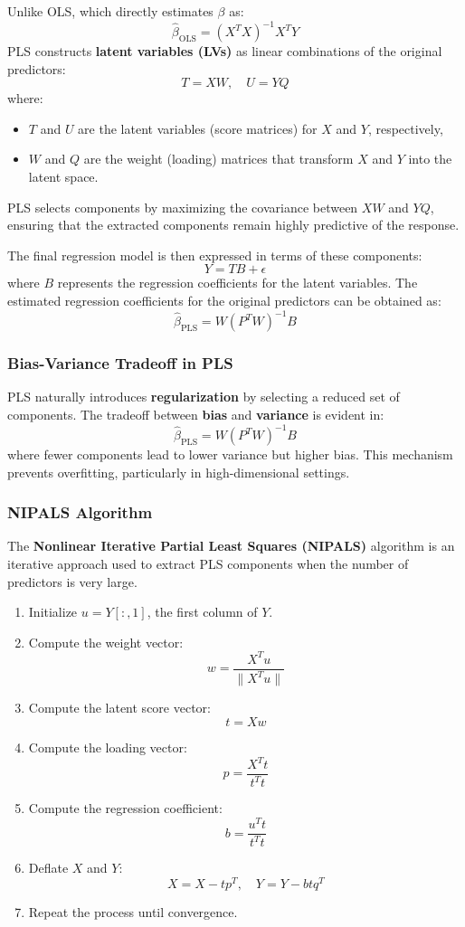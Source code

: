 \documentclass[11pt,twoside,a4paper]{article}
\begin{document}
Unlike OLS, which directly estimates \( \beta \) as:
\[
\hat{\beta}_{\text{OLS}} = (X^T X)^{-1} X^T Y
\]
PLS constructs \textbf{latent variables (LVs)} as linear combinations of the original predictors:
\[
T = XW, \quad U = YQ
\]
where:
\begin{itemize}
    \item \( T \) and \( U \) are the latent variables (score matrices) for \( X \) and \( Y \), respectively,
    \item \( W \) and \( Q \) are the weight (loading) matrices that transform \( X \) and \( Y \) into the latent space.
\end{itemize}

PLS selects components by maximizing the covariance between \( XW \) and \( YQ \), ensuring that the extracted components remain highly predictive of the response.

The final regression model is then expressed in terms of these components:
\[
Y = T B + \epsilon
\]
where \( B \) represents the regression coefficients for the latent variables. The estimated regression coefficients for the original predictors can be obtained as:
\[
\hat{\beta}_{\text{PLS}} = W (P^T W)^{-1} B
\]

\subsubsection{Bias-Variance Tradeoff in PLS}
PLS naturally introduces \textbf{regularization} by selecting a reduced set of components. The tradeoff between \textbf{bias} and \textbf{variance} is evident in:
\[
\hat{\beta}_{\text{PLS}} = W (P^T W)^{-1} B
\]
where fewer components lead to lower variance but higher bias. This mechanism prevents overfitting, particularly in high-dimensional settings.

\subsubsection{NIPALS Algorithm}
The \textbf{Nonlinear Iterative Partial Least Squares (NIPALS)} algorithm is an iterative approach used to extract PLS components when the number of predictors is very large.

\begin{enumerate}
    \item Initialize \( u = Y[:,1] \), the first column of \( Y \).
    \item Compute the weight vector:
        \[
        w = \frac{X^T u}{\|X^T u\|}
        \]
    \item Compute the latent score vector:
        \[
        t = Xw
        \]
    \item Compute the loading vector:
        \[
        p = \frac{X^T t}{t^T t}
        \]
    \item Compute the regression coefficient:
        \[
        b = \frac{u^T t}{t^T t}
        \]
    \item Deflate \( X \) and \( Y \):
        \[
        X = X - tp^T, \quad Y = Y - btq^T
        \]
    \item Repeat the process until convergence.
\end{enumerate}
\end{document}
